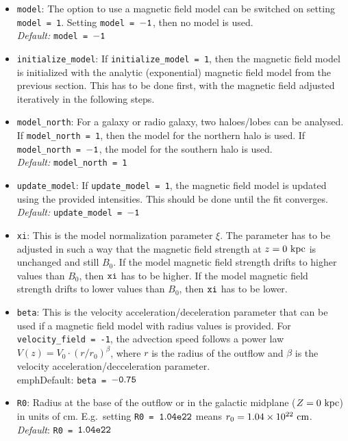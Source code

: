 \documentclass[11pt,twocolumn,a4paper]{article}
\begin{document}
\begin{itemize}
\item {\tt model}: The option to use a magnetic field model can be switched on setting {\tt model = 1}. Setting {\tt model = $\tt -1$}, then no model is used.\\
\emph{Default:} {\tt model = $\tt -1$}
\item {\tt initialize\_model}: If {\tt initialize\_model = 1}, then the magnetic field model is initialized with the analytic (exponential) magnetic field model from the previous section. This has to be done first, with the magnetic field adjusted iteratively in the following steps.
\item {\tt model\_north}: For a galaxy or radio galaxy, two haloes/lobes can be analysed. If {\tt model\_north = 1}, then the model for the northern halo is used.  If {\tt model\_north = $\tt -1$}, the model for the southern halo is used.\\
\emph{Default:} {\tt model\_north = 1}
\item {\tt update\_model}: If {\tt update\_model = 1}, the magnetic field model is updated using the provided intensities. This should be done until the fit converges.\\
\emph{Default:} {\tt update\_model = $\tt -1$}
\item {\tt xi}: This is the model normalization parameter $\xi$. The parameter has to be adjusted in such a way that the magnetic field strength at $z=0~\rm kpc$ is unchanged and still $B_0$. If the model magnetic field strength drifts to higher values than $B_0$, then $\tt xi$ has to be higher. If the model magnetic field strength drifts to lower values than $B_0$, then $\tt xi$ has to be lower.
\item {\tt beta}: This is the velocity acceleration/deceleration parameter that can be used if a magnetic field model with radius values is provided. For {\tt velocity\_field = -1}, the advection speed follows a power law $V(z)=V_0\cdot (r/r_0)^{\beta}$, where $r$ is the radius of the outflow and $\beta$ is the velocity acceleration/decceleration parameter.\\
emph{Default:} {\tt beta = $\tt -0.75$}
\item {\tt R0}: Radius at the base of the outflow or in the galactic midplane ($Z=0~\rm kpc$) in units of cm. E.g.\ setting {\tt R0 = $\tt 1.04e22$} means $r_0 = 1.04\times 10^{22}~\rm cm$.\\
\emph{Default}: {\tt R0 = $\tt 1.04e22$}
\end{itemize}
\end{document}
